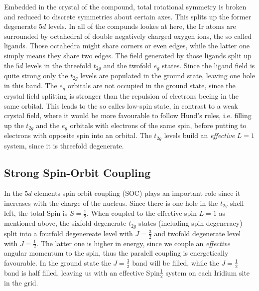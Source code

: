 \documentclass[a4paper,10pt]{report}
\begin{document}
Embedded in the crystal of the compound, total rotational symmetry is broken and reduced to discrete symmetries about certain axes. 
This splits up the former degenerate $5d$ levels. 
In all of the compunds lookes at here, the $\mathrm{Ir}$ atoms are surrounded by octahedral of double negatively charged oxygen ions, the so called ligands. 
Those octahedra might share corners or even edges, while the latter one simply means they share two edges. 
%
%
The field generated by those ligands split up the $5d$ levels in the threefold $t_{2g}$ and the twofold $e_g$ states. 
Since the ligand field is quite strong
only the $t_{2g}$ levels are populated in the ground state, leaving one hole in this band. 
The $e_g$ orbitals are not occupied in the ground state, since the crystal field splitting is stronger than the repulsion of electrons beeing in the same orbital. 
This leads to the so calles low-spin state, in contrast to a weak crystal field, 
where it would be more favourable to follow Hund's rules, 
i.e. filling up the $t_{2g}$ and the $e_g$ orbitals with electrons of the same spin, before putting to electrons with opposite spin into an orbital.
The $t_{2g}$ levels build an \emph{effective} $L=1$ system, since it is threefold degenerate.

\subsection{Strong Spin-Orbit Coupling}

In the $5d$ elements spin orbit coupling (SOC) plays an important role since it increases with the charge of the nucleus.
Since there is one hole in the $t_{2g}$ shell left, the total Spin is $S=\frac12$. 
When coupled to the effective spin $L=1$ as mentioned above, 
the sixfold degenerate $t_{2g}$ states (including spin degeneracy) split into a fourfold degenereate level with $J=\frac32$
and twofold degenerate level with $J=\frac12$. The latter one is higher in energy, since we couple an \emph{effective} angular momentum to the spin,
thus the paralell coupling is energetically favourable.
In the ground state the $J=\frac32$ band will be filled, while the $J=\frac12$ band is half filled, leaving us with an effective Spin$\frac12$ system on each Iridium site in the grid.
\end{document}
